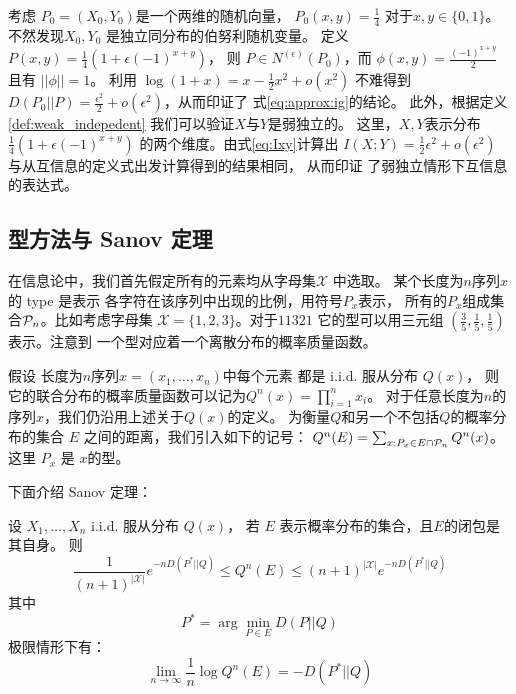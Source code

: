 \begin{example}\label{ex:Pweak_1}
考虑 $P_0=(X_0,Y_0)$是一个两维的随机向量，
$P_0(x,y)=\frac{1}{4}$ 对于$x,y \in \{0,1\}$。
不然发现$X_0,Y_0$
是独立同分布的伯努利随机变量。
定义 $P(x,y)=\frac{1}{4}(1+\epsilon (-1)^{x+y})$，
则 $P\in N^{(\epsilon)}(P_0)$，而
$\phi(x,y) = \frac{(-1)^{x+y}}{2}$
且有 $||\phi||=1$。
利用 $\log(1+x) = x - \frac{1}{2}x^2 + o(x^2)$
不难得到 $D(P_0||P)=\frac{\epsilon^2}{2}
+o(\epsilon^2)$，从而印证了
式\eqref{eq:approx:ig}的结论。
此外，根据定义\ref{def:weak_indepedent}
我们可以验证$X$与$Y$是弱独立的。
这里，$X,Y$表示分布$\frac{1}{4}(1+\epsilon (-1)^{x+y})$
的两个维度。由式\eqref{eq:Ixy}计算出
$I(X;Y)=\frac{1}{2}\epsilon^2+o(\epsilon^2)$
与从互信息的定义式出发计算得到的结果相同，
从而印证
了弱独立情形下互信息的表达式。
\end{example}

\subsection{型方法与 Sanov 定理}
在信息论中，我们首先假定所有的元素均从字母集$\mathcal{X}$
中选取。
某个长度为$n$序列$x$的 \gls{type} 是表示
各字符在该序列中出现的比例，用符号$P_x$表示，
所有的$P_x$组成集合$\P_n$。比如考虑字母集
$\mathcal{X}=\{1,2,3\}$。对于$11321$
它的型可以用三元组 $(\frac{3}{5}, 
\frac{1}{5}, \frac{1}{5})$ 表示。注意到
一个型对应着一个离散分布的概率质量函数。

假设 长度为$n$序列$x=(x_1,\dots, x_n)$中每个元素 都是 i.i.d. 服从分布 $Q(x)$，
则它的联合分布的概率质量函数可以记为$Q^n(x)=\prod_{i=1}^n x_i$。
对于任意长度为$n$的序列$x$，我们仍沿用上述关于$Q(x)$的定义。
为衡量$Q$和另一个不包括$Q$的概率分布的集合 $E$ 之间的距离，我们引入如下的记号：
$Q^n(E) = \sum_{x: P_x \in E \cap \P_n} Q^n(x)$。
这里 $P_x$ 是 $x$的型。

下面介绍 Sanov 定理：
\begin{theorem}
  设 $X_1, \dots, X_n$ i.i.d. 服从分布 $Q(x)$，
  若 $E$ 表示概率分布的集合，且$E$的闭包是其自身。
  则
  \begin{equation}
  \frac{1}{(n+1)^{|\mathcal{X}|}} e^{-n D(P^*||Q)}
  \leq Q^n(E) \leq (n+1)^{|\mathcal{X}|} e^{-n D(P^*||Q)}
  \end{equation}
  其中
  \begin{equation}
    P^* = \arg\min_{P\in E} D(P||Q)
  \end{equation}
  极限情形下有：
  \begin{equation}
    \lim_{n\to \infty} \frac{1}{n} \log Q^n(E) = -D(P^*||Q)
  \end{equation}
\end{theorem}
